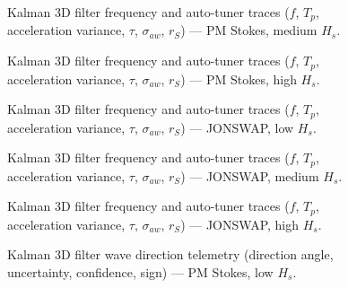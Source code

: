 \documentclass[11pt,letterpaper]{article}
\begin{document}
    \begin{figure}[H]\centering
    \resizebox{\textwidth}{!}{}
    \caption{Kalman 3D filter frequency and auto-tuner traces ($f$, $T_p$, acceleration variance, $\tau$, $\sigma_{aw}$, $r_S$) --- PM Stokes, medium $H_s$.}
    \label{fig:w3d_ou3_pmstokes_medium_tuner}
    \end{figure}

    \begin{figure}[H]\centering
    \resizebox{\textwidth}{!}{}
    \caption{Kalman 3D filter frequency and auto-tuner traces ($f$, $T_p$, acceleration variance, $\tau$, $\sigma_{aw}$, $r_S$) --- PM Stokes, high $H_s$.}
    \label{fig:w3d_ou3_pmstokes_high_tuner}
    \end{figure}

    \begin{figure}[H]\centering
    \resizebox{\textwidth}{!}{}
    \caption{Kalman 3D filter frequency and auto-tuner traces ($f$, $T_p$, acceleration variance, $\tau$, $\sigma_{aw}$, $r_S$) --- JONSWAP, low $H_s$.}
    \label{fig:w3d_ou3_jonswap_low_tuner}
    \end{figure}

    \begin{figure}[H]\centering
    \resizebox{\textwidth}{!}{}
    \caption{Kalman 3D filter frequency and auto-tuner traces ($f$, $T_p$, acceleration variance, $\tau$, $\sigma_{aw}$, $r_S$) --- JONSWAP, medium $H_s$.}
    \label{fig:w3d_ou3_jonswap_medium_tuner}
    \end{figure}

    \begin{figure}[H]\centering
    \resizebox{\textwidth}{!}{}
    \caption{Kalman 3D filter frequency and auto-tuner traces ($f$, $T_p$, acceleration variance, $\tau$, $\sigma_{aw}$, $r_S$) --- JONSWAP, high $H_s$.}
    \label{fig:w3d_ou3_jonswap_high_tuner}
    \end{figure}



    \begin{figure}[H]\centering
    \resizebox{\textwidth}{!}{}
    \caption{Kalman 3D filter wave direction telemetry (direction angle, uncertainty, confidence, sign) — PM Stokes, low $H_s$.}
    \label{fig:w3d_ou3_pmstokes_low_dir}
    \end{figure}
\end{document}
